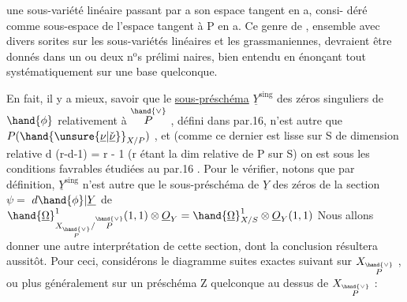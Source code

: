 
une sous-variété linéaire passant par a son espace tangent en a, consi-%
déré comme sous-espace  de l'espace tangent à P en a. Ce genre
\placedmargin{\hand{||}}de , ensemble avec divers sorites sur les sous-variétés linéaires
et les grassmaniennes, devraient être donnés dans un ou deux n$^{\text{o}}$s prélimi
naires, bien entendu en énonçant tout systématiquement sur une base
quelconque.

En fait, il y a mieux, savoir que le \uline{sous-préschéma} $\underline{Y}^{\mathrm{sing}}$
des zéros singuliers de $\hand{\phi}$ relativement à $\overset{\hand{\vee}}{P}$ , défini dans par.16, n'est
autre que $P(\hand{\unsure{\underline{\nu}|\check{\underline{\nu}}}}_{X/P})$ , et (comme ce dernier est lisse sur S de dimension
relative d \unsure{$+$} (r-d-1) = r - 1 (r étant la dim relative de P sur S)
on est sous les conditions favrables étudiées au par.16 .  Pour le vérifier,
notons que par définition, $\underline{Y}^{\mathrm{sing}}$ n'est autre que le sous-préschéma de $\underline{Y}$
des zéros de la section $\psi =$ $d\hand{\phi}|\underline{Y}$ de $\hand{\underline{\Omega}}^1_{X_{\overset{\hand{\vee}}{P}}/\overset{\hand{\vee}}{P}}(1,1)\otimes \underline{O}_Y = \hand{\underline{\Omega}}^1_{X/S}\otimes\underline{O}_Y(1,1)$
Nous allons donner une autre interprétation de cette section, dont
la conclusion résultera aussitôt. Pour ceci, considérons le diagramme
 suites exactes
suivant sur $X_{\overset{\hand{\vee}}{P}}$ , ou plus généralement sur un préschéma Z quelconque au dessus de
$X_{\overset{\hand{\vee}}{P}}$ :

